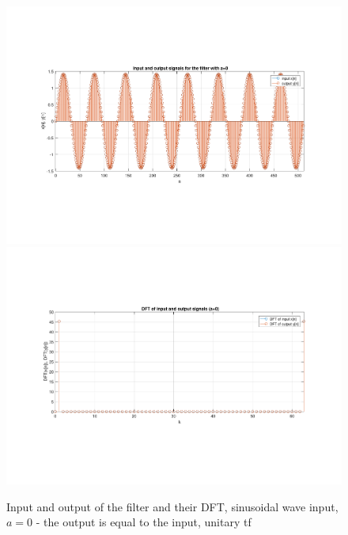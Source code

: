 \begin{figure} [H]
	\centering
	\includegraphics[trim={2.5cm 5cm 2.5cm 5cm}, clip, width=0.75\linewidth]{io_sin_4}
	\includegraphics[trim={2.5cm 5cm 2.5cm 5cm}, clip, width=0.75\linewidth]{dft_sin_4}
	\caption{Input and output of the filter and their DFT, sinusoidal wave input, $a=0$ - the output is equal to the input, unitary tf}
	\label{fig:t1_io_sin_4}
\end{figure}
